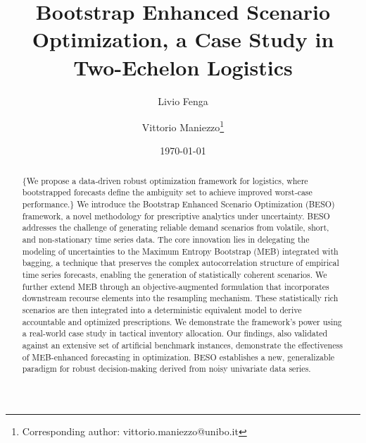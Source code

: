 \documentclass[11pt]{article}
\begin{document}
\let\WriteBookmarks\relax
\def\floatpagepagefraction{1}
\def\textpagefraction{.001}
	
\setlength{\abovedisplayskip}{2pt plus 2pt minus 4pt}
\setlength{\belowdisplayskip}{2pt plus 2pt minus 4pt}
\setlength{\abovedisplayshortskip}{0pt}
\setlength{\belowdisplayshortskip}{0pt}

\title{Bootstrap Enhanced Scenario Optimization, a Case Study in Two-Echelon Logistics}

\author[1]{Livio Fenga}
\author[2]{Vittorio Maniezzo\thanks{Corresponding author: vittorio.maniezzo@unibo.it}}


\date{\today}

\maketitle

\begin{abstract}
\{We propose a data‑driven robust optimization framework for logistics, where bootstrapped forecasts define the ambiguity set to achieve improved worst‑case performance.\}
We introduce the Bootstrap Enhanced Scenario Optimization (BESO) framework, a novel methodology for prescriptive analytics under uncertainty. BESO addresses the challenge of generating reliable demand scenarios from volatile, short, and non-stationary time series data. The core innovation lies in delegating the modeling of uncertainties to the Maximum Entropy Bootstrap (MEB) integrated with bagging, a technique that preserves the complex autocorrelation structure of empirical time series forecasts, enabling the generation of statistically coherent scenarios. We further extend MEB through an objective-augmented formulation that incorporates downstream recourse elements into the resampling mechanism. These statistically rich scenarios are then integrated into a deterministic equivalent model to derive accountable and optimized prescriptions. We demonstrate the framework's power using a real-world case study in tactical inventory allocation. Our findings, also validated against an extensive set of artificial benchmark instances, demonstrate the effectiveness of MEB-enhanced forecasting in optimization. BESO establishes a new, generalizable paradigm for robust decision-making derived from noisy univariate data series.
\end{abstract}
\end{document}
